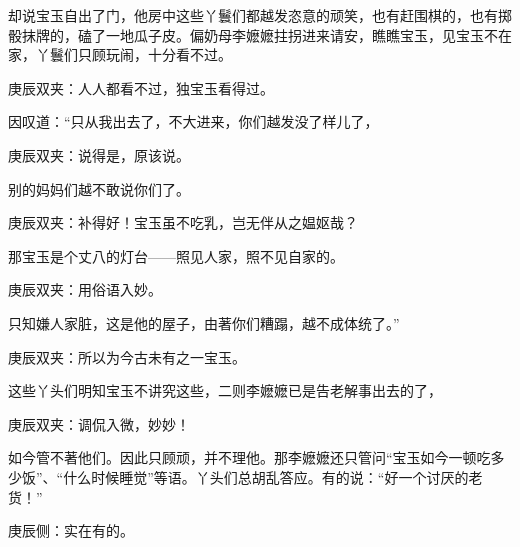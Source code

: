 \begin{parag}
    却说宝玉自出了门，他房中这些丫鬟们都越发恣意的顽笑，也有赶围棋的，也有掷骰抹牌的，磕了一地瓜子皮。偏奶母李嬷嬷拄拐进来请安，瞧瞧宝玉，见宝玉不在家，丫鬟们只顾玩闹，十分看不过。\begin{note}庚辰双夹：人人都看不过，独宝玉看得过。\end{note}因叹道：“只从我出去了，不大进来，你们越发没了样儿了，\begin{note}庚辰双夹：说得是，原该说。\end{note}别的妈妈们越不敢说你们了。\begin{note}庚辰双夹：补得好！宝玉虽不吃乳，岂无伴从之媪妪哉？\end{note}那宝玉是个丈八的灯台——照见人家，照不见自家的。\begin{note}庚辰双夹：用俗语入妙。\end{note}只知嫌人家脏，这是他的屋子，由著你们糟蹋，越不成体统了。”\begin{note}庚辰双夹：所以为今古未有之一宝玉。\end{note}这些丫头们明知宝玉不讲究这些，二则李嬷嬷已是告老解事出去的了，\begin{note}庚辰双夹：调侃入微，妙妙！\end{note}如今管不著他们。因此只顾顽，并不理他。那李嬷嬷还只管问“宝玉如今一顿吃多少饭”、“什么时候睡觉”等语。丫头们总胡乱答应。有的说：“好一个讨厌的老货！”\begin{note}庚辰侧：实在有的。\end{note}
\end{parag}


